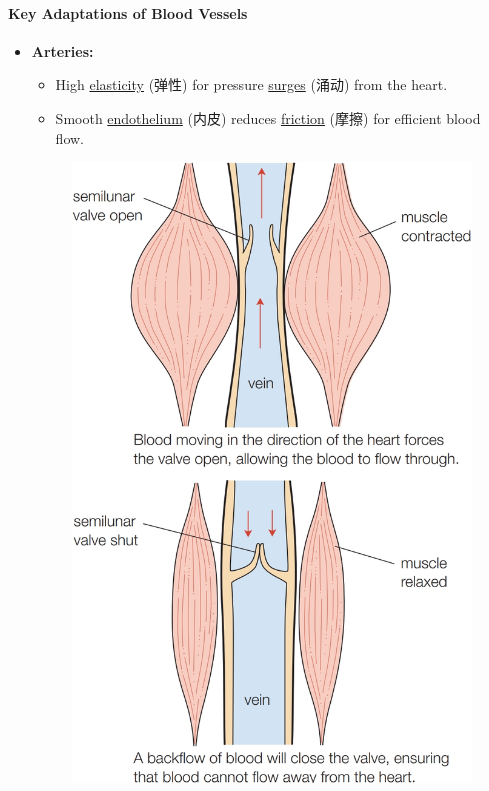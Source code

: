 \paragraph{Key Adaptations of Blood Vessels}
\begin{itemize}
    \item \textbf{Arteries:}
    \begin{itemize}
        \item High \underline{elasticity} (弹性) for pressure \underline{surges} (涌动) from the heart.
        \item Smooth \underline{endothelium} (内皮) reduces \underline{friction} (摩擦) for efficient blood flow.
    \end{itemize}
    \begin{figure}[H]
        \centering
        \includegraphics[scale=0.18]{Biology/1B/Images/1B-3-5.png}

\end{figure}
\end{itemize}
